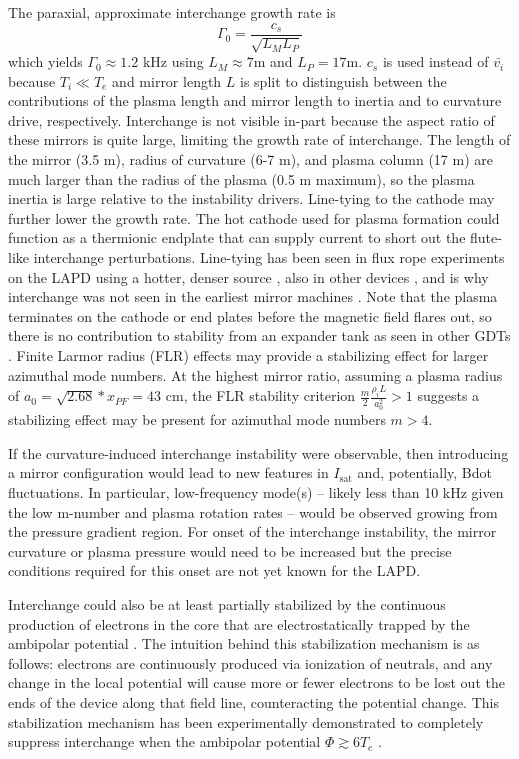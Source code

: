 The paraxial, approximate interchange growth rate is \cite{Post_1987,Ryutov_2011}
\begin{equation}
    \Gamma_0 = \frac{c_s}{\sqrt{L_M L_P}}
\end{equation}
which yields $\Gamma_0 \approx 1.2$ kHz using $L_M \approx 7$m and $L_P = 17$m. $c_s$ is used instead of $\bar{v_i}$ because $T_i \ll T_e$ and mirror length $L$ is split to distinguish between the contributions of the plasma length and mirror length to inertia and to curvature drive, respectively.
Interchange is not visible in-part because the aspect ratio of these mirrors is quite large, limiting the growth rate of interchange. The length of the mirror (3.5 m), radius of curvature (6-7 m), and plasma column (17 m) are much larger than the radius of the plasma (0.5 m maximum), so the plasma inertia is large relative to the instability drivers. Line-tying to the cathode may further lower the growth rate. The hot cathode used for plasma formation could function as a thermionic endplate that can supply current to short out the flute-like interchange perturbations. Line-tying has been seen in flux rope experiments on the LAPD using a hotter, denser source \cite{Compernolle_2011}, also in other devices \cite{Fornaca_1979}, and is why interchange was not seen in the earliest mirror machines \cite{Post_1987}. Note that the plasma terminates on the cathode or end plates before the magnetic field flares out, so there is no contribution to stability from an expander tank as seen in other GDTs \cite{Ryutov_2011,Ivanov_2013}. 
Finite Larmor radius (FLR) effects may provide a stabilizing effect for larger azimuthal mode numbers. 
At the highest mirror ratio, assuming a plasma radius of $a_0 =\sqrt{2.68} * x_{PF}=43$ cm, the FLR stability criterion $\frac{m}{2} \frac{\rho_i L}{a_0^2} > 1$ \cite{Ryutov_2011} suggests a stabilizing effect may be present for azimuthal mode numbers $m > 4$.

If the curvature-induced interchange instability were observable, then introducing a mirror configuration would lead to new features in $I_\text{sat}$ and, potentially, Bdot fluctuations. In particular, low-frequency mode(s)  -- likely less than 10 kHz given the low m-number and plasma rotation rates -- would be observed growing from the pressure gradient region. For onset of the interchange instability, the mirror curvature or plasma pressure would need to be increased but the precise conditions required for this onset are not yet known for the LAPD.

Interchange could also be at least partially stabilized by the continuous production of electrons in the core that are electrostatically trapped by the ambipolar potential \cite{Guest_1971}. The intuition behind this stabilization mechanism is as follows: electrons are continuously produced via ionization of neutrals, and any change in the local potential will cause more or fewer electrons to be lost out the ends of the device along that field line, counteracting the potential change. This stabilization mechanism has been experimentally demonstrated  to completely suppress interchange when the ambipolar potential $\Phi \gtrsim 6T_e$ \cite{Komori_1987}.

